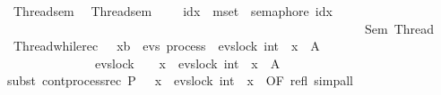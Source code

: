 \begin{isabellebody}
\isanewline
{}\isamarkupfalse%
\ Thread{}{\isacharunderscore}{\kern0pt}sem\ \ \isanewline
{\isachardoublequoteopen}Thread{}{\isacharunderscore}{\kern0pt}sem\ {\isasymequiv}\ \ {\isacharparenleft}{\kern0pt}\ \isactrlbold {\isacharbar}{\kern0pt}\isactrlbold {\isacharbar}{\kern0pt}\isactrlbold {\isacharbar}{\kern0pt}\ idx\ {\isasymin}{\isacharhash}{\kern0pt}\ mset\ {\isacharbrackleft}{\kern0pt}{}{\isachardot}{\kern0pt}{\isachardot}{\kern0pt}{}{\isacharbrackright}{\kern0pt}{\isachardot}{\kern0pt}\ semaphore\ idx\ {\isacharparenright}{\kern0pt}\ \ \isanewline
\ \ \ \ \ \ \ \ \ \ \ \ \ \ \ \ \ \isanewline
\ \ \ \ \ \ \ \ \ \ \ \ \ \ \ \ \ \ {\isacharbar}{\kern0pt}{\isacharbar}{\kern0pt}\isanewline
\ \isanewline
\ \ \ \ \ \ \ \ \ \ \ \ \ \ \ \ \ \ \ Sem\ Thread{}{\isachardoublequoteclose}\isanewline
\isanewline
{}\isamarkupfalse%
\ Thread{}{\isacharunderscore}{\kern0pt}while{\isacharunderscore}{\kern0pt}rec\ {\isacharcolon}{\kern0pt}\ {\isachardoublequoteopen}{\isacharparenleft}{\kern0pt}{\isasymmu}\ x{\isacharcolon}{\kern0pt}{\isacharcolon}{\kern0pt}{\isacharprime}{\kern0pt}b\ {\isasymRightarrow}\ evs\ process{\isachardot}{\kern0pt}\ {\isacharparenleft}{\kern0pt}{\isasymlambda}{\isasymsigma}{\isachardot}{\kern0pt}\ evs{\isachardot}{\kern0pt}lock\ {\isacharparenleft}{\kern0pt}{}{\isacharcolon}{\kern0pt}{\isacharcolon}{\kern0pt}int{\isacharparenright}{\kern0pt}\ {\isasymrightarrow}\ x\ {\isasymsigma}{\isacharparenright}{\kern0pt}{\isacharparenright}{\kern0pt}\ A\ \isanewline
\ \ \ \ \ \ \ \ \ \ \ \ \ {\isacharequal}{\kern0pt}\ evs{\isachardot}{\kern0pt}lock\ {}\ {\isasymrightarrow}\ {\isacharparenleft}{\kern0pt}{\isasymmu}\ x{\isachardot}{\kern0pt}\ {\isacharparenleft}{\kern0pt}{\isasymlambda}{\isasymsigma}{\isachardot}{\kern0pt}\ evs{\isachardot}{\kern0pt}lock\ {\isacharparenleft}{\kern0pt}{}{\isacharcolon}{\kern0pt}{\isacharcolon}{\kern0pt}int{\isacharparenright}{\kern0pt}\ {\isasymrightarrow}\ x\ {\isasymsigma}{\isacharparenright}{\kern0pt}{\isacharparenright}{\kern0pt}\ A{\isachardoublequoteclose}\isanewline
%
\isadelimproof
\ \ %
\endisadelimproof
%
\isatagproof
{}\isamarkupfalse%
{\isacharparenleft}{\kern0pt}subst\ cont{\isacharunderscore}{\kern0pt}process{\isacharunderscore}{\kern0pt}rec{\isacharbrackleft}{\kern0pt}\ P\ {\isacharequal}{\kern0pt}\ {\isacartoucheopen}{\isacharparenleft}{\kern0pt}{\isasymmu}\ x{\isachardot}{\kern0pt}\ {\isacharparenleft}{\kern0pt}{\isasymlambda}{\isasymsigma}{\isachardot}{\kern0pt}\ evs{\isachardot}{\kern0pt}lock\ {\isacharparenleft}{\kern0pt}{}{\isacharcolon}{\kern0pt}{\isacharcolon}{\kern0pt}int{\isacharparenright}{\kern0pt}\ {\isasymrightarrow}\ x\ {\isasymsigma}{\isacharparenright}{\kern0pt}{\isacharparenright}{\kern0pt}{\isacartoucheclose}{\isacharcomma}{\kern0pt}\ OF\ refl{\isacharbrackright}{\kern0pt}{\isacharparenright}{\kern0pt}\ simp{\isacharunderscore}{\kern0pt}all%

\end{isabellebody}
